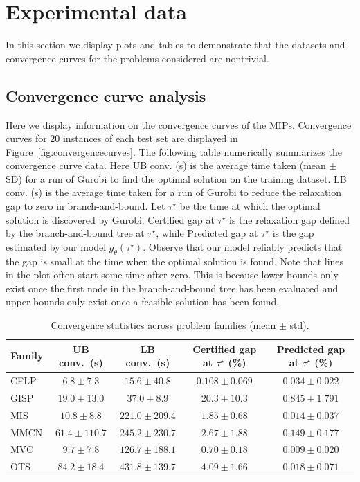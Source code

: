 \documentclass[12pt]{article}
\theoremstyle{definition}
\theoremstyle{remark}
\newcommand{\param}{\theta}
\newcommand{\change}[1]{#1}
\newcommand{\param}{\theta}
\newcommand{\change}[1]{#1}
\theoremstyle{plain}
\theoremstyle{definition}
\theoremstyle{remark}
\begin{document}
\appendix
\onecolumn
\change{
\section{Experimental data} \label{appendix:experimentplots}
In this section we display plots and tables to demonstrate that the datasets and convergence curves for the problems considered are nontrivial.
\subsection{Convergence curve analysis}
Here we display information on the convergence curves of the MIPs.
Convergence curves for 20 instances of each test set are displayed in Figure~\ref{fig:convergencecurves}.
The following table numerically summarizes the convergence curve data.
Here UB conv. (s) is the average time taken (mean $\pm$ SD) for a run of Gurobi to find the optimal solution on the training dataset.
LB conv. (s) is the average time taken for a run of Gurobi to reduce the relaxation gap to zero in branch-and-bound.
Let $\tau^\star$ be the time at which the optimal solution is discovered by Gurobi. 
Certified gap at $\tau^\star$ is the relaxation gap defined by the branch-and-bound tree at $\tau^\star$, while Predicted gap at $\tau^\star$ is the gap estimated by our model $g_\param(\tau^\star)$.
Observe that our model reliably predicts that the gap is small at the time when the optimal solution is found.
Note that lines in the plot often start some time after zero. This is because lower-bounds only exist once the first node in the branch-and-bound tree has been evaluated and upper-bounds only exist once a feasible solution has been found.
\begin{table}[ht]
\centering
\caption{Convergence statistics across problem families (mean $\pm$ std).}
\label{tab:convergence_stats}
\begin{tabular}{lcccc}
\toprule
Family & UB conv.\ (s) & LB conv.\ (s) & Certified gap at $\tau^\star$ (\%) & Predicted gap at $\tau^\star$ (\%) \\
\midrule
CFLP  & $6.8 \pm 7.3$    & $15.6 \pm 40.8$   & $0.108 \pm 0.069$ & $0.034 \pm 0.022$ \\
GISP  & $19.0 \pm 13.0$  & $37.0 \pm 8.9$    & $20.3 \pm 10.3$   & $0.845 \pm 1.791$ \\
MIS   & $10.8 \pm 8.8$   & $221.0 \pm 209.4$ & $1.85 \pm 0.68$   & $0.014 \pm 0.037$ \\
MMCN  & $61.4 \pm 110.7$ & $245.2 \pm 230.7$ & $2.67 \pm 1.88$   & $0.149 \pm 0.177$ \\
MVC   & $9.7 \pm 7.8$    & $126.7 \pm 188.1$ & $0.70 \pm 0.18$   & $0.009 \pm 0.020$ \\
OTS   & $84.2 \pm 18.4$  & $431.8 \pm 139.7$ & $4.09 \pm 1.66$   & $0.018 \pm 0.071$ \\
\bottomrule
\end{tabular}
\end{table}

}
\end{document}
